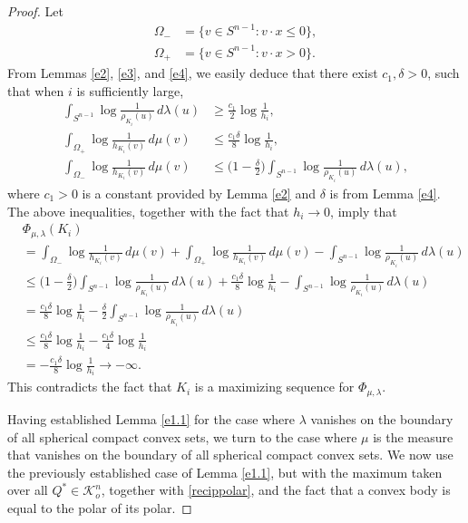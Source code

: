 \documentclass{cpamart1}     %
\theoremstyle{definition}
\theoremstyle{remark}
\newcommand{\sn}{S^{n-1}}
\newcommand{\kno}{\mathcal K^n_o}
\begin{document}
\begin{proof}
Let
\begin{align*}
\Omega_{-}
&= \big\{v\in\sn : v\cdot x \le 0\big\}, \\
\Omega_+ &= \big\{v\in\sn : v\cdot x > 0\big\}.
\end{align*}
From Lemmas \ref{e2}, \ref{e3}, and \ref{e4}, we easily deduce that there exist $c_1,\delta > 0$, such that when $i$ is sufficiently large,
\begin{equation*}
\begin{aligned}
\int_{S^{n-1}}\log\frac1{\rho_{K_i}(u)}\,d\lambda(u)
&\geq \frac{c_1}{2}\log \frac1{h_i},\\
\int_{\Omega_+}\log\frac1{h_{K_i}(v)}\, d\mu(v)
&\leq \frac{c_1\delta}{8} \log\frac1{h_i},\\
\int_{\Omega_{-}}\log\frac1{h_{K_i}(v)}\, d\mu(v)
&\leq \big(1-\frac\delta2\big)\int_{S^{n-1}}\log\frac1{\rho_{K_i}(u)}\,d\lambda(u),
\end{aligned}
\end{equation*}
where $c_1>0$ is a constant provided by Lemma \ref{e2} and $\delta$ is from Lemma \ref{e4}.
The above inequalities, together with the fact that $h_i\rightarrow 0$, imply that
\begin{equation*}
\begin{aligned}
&\Phi_{\mu,\lambda}(K_i)\\
&=\int_{\Omega_{-}}\log\frac1{h_{K_i}(v)}\,d\mu(v) +
\int_{\Omega_+}\log\frac1{h_{K_i}(v)}\, d\mu(v)
-\int_{S^{n-1}}\log\frac1{\rho_{K_i}(u)}\,d\lambda(u)\\
&\leq  \big(1-{\textstyle\frac\delta 2}\big)\int_{S^{n-1}}\log\frac1{\rho_{K_i}(u)}\,
d\lambda(u) +\frac{c_1\delta}{8}\log \frac1{h_i}
 -\int_{S^{n-1}}\log\frac1{\rho_{K_i}(u)}\,d\lambda(u) \\
&=\frac{c_1\delta}{8}\log \frac1{h_i}
 -\frac{\delta}{2}\int_{S^{n-1}}\log\frac1{\rho_{K_i}(u)}\,d\lambda(u)\\
&\leq\frac{c_1\delta}{8}\log \frac1{h_i}-\frac{c_1 \delta}{4}\log\frac1{h_i}\\
&=-\frac{c_1\delta}{8}\log \frac1{h_i} \rightarrow -\infty.
\end{aligned}
\end{equation*}
This contradicts the fact that $K_i$ is
a maximizing sequence for $\Phi_{\mu,\lambda}$.

Having established Lemma \ref{e1.1} for the case where $\lambda$ vanishes on the boundary
of all spherical compact convex sets, we turn to the case where
$\mu$ is the measure that vanishes on the boundary
of all spherical compact convex sets. We now use the previously established case of Lemma \ref{e1.1},
but with the maximum taken over all $Q^*\in\kno$, together with \eqref{recippolar},
and the fact that a convex body is equal to the polar of its polar.
\end{proof}
\end{document}
